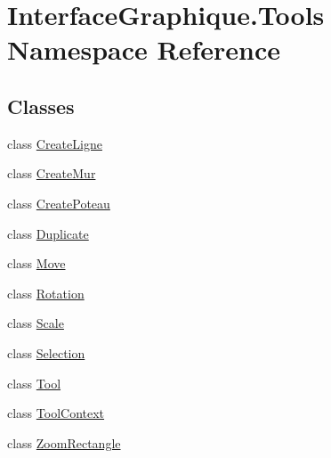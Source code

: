 \hypertarget{namespace_interface_graphique_1_1_tools}{}\section{Interface\+Graphique.\+Tools Namespace Reference}
\label{namespace_interface_graphique_1_1_tools}
\subsection*{Classes}
\begin{DoxyCompactItemize}
\item 
class \hyperlink{class_interface_graphique_1_1_tools_1_1_create_ligne}{Create\+Ligne}
\item 
class \hyperlink{class_interface_graphique_1_1_tools_1_1_create_mur}{Create\+Mur}
\item 
class \hyperlink{class_interface_graphique_1_1_tools_1_1_create_poteau}{Create\+Poteau}
\item 
class \hyperlink{class_interface_graphique_1_1_tools_1_1_duplicate}{Duplicate}
\item 
class \hyperlink{class_interface_graphique_1_1_tools_1_1_move}{Move}
\item 
class \hyperlink{class_interface_graphique_1_1_tools_1_1_rotation}{Rotation}
\item 
class \hyperlink{class_interface_graphique_1_1_tools_1_1_scale}{Scale}
\item 
class \hyperlink{class_interface_graphique_1_1_tools_1_1_selection}{Selection}
\item 
class \hyperlink{class_interface_graphique_1_1_tools_1_1_tool}{Tool}
\item 
class \hyperlink{class_interface_graphique_1_1_tools_1_1_tool_context}{Tool\+Context}
\item 
class \hyperlink{class_interface_graphique_1_1_tools_1_1_zoom_rectangle}{Zoom\+Rectangle}
\end{DoxyCompactItemize}
